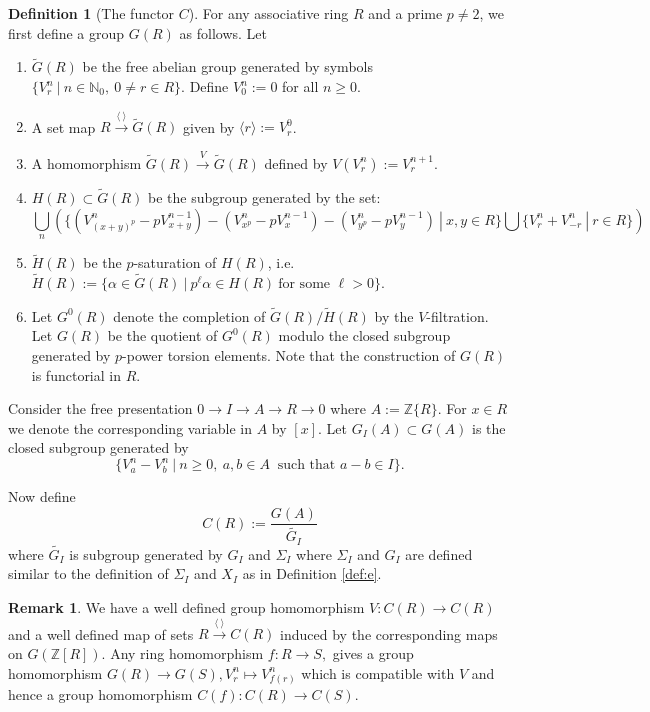 \documentclass[11pt]{amsart}
\theoremstyle{plain}
\theoremstyle{definition}
\newtheorem{remark}[thm]{Remark}
\newtheorem{definition}[thm]{Definition}
\newcommand{\Union}{\bigcup}
\renewcommand{\tilde}{\widetilde}
\newcommand{\N}{{\mathbb N}}
\newcommand{\Z}{{\mathbb Z}}
\newcommand{\ab}[1]{\langle {#1} \rangle}
\begin{document}
\begin{definition}[The functor $C$]\label{def:C}
For any associative ring $R$ and a prime $p\neq 2$, we first define a group $G(R)$ as follows. Let 
\begin{enumerate}
\item $\tilde{G}(R)$ be the free abelian group generated by symbols $\{ V^n_r \ | \ n\in \N_0 , \ 0\neq r\in R\}$. Define $V^n_0:=0$ for all $n\geq0$. 
\item A set map $R \xrightarrow{\ab{\ } } \tilde{G}(R)$ given by $\ab{r} := V^0_r$.
\item A homomorphism $\tilde{G}(R) \xrightarrow{V} \tilde{G}(R)$ defined by $V(V^n_r):= V^{n+1}_r$.
\item $H(R)\subset \tilde{G}(R)$ be the subgroup generated by the set: 
$$  \Union_n\left(\{(V^n_{(x+y)^p} - p V^{n-1}_{x+y}) - (V^n_{x^p} - p V^{n-1}_{x}) - (V^n_{y^p} - p V^{n-1}_{y})\ | \ x, y \in R \} \Union \{V^n_r+V^n_{-r} \ | \ r \in R\}\right)$$ 
\item $\tilde{H}(R)$ be the $p$-saturation of $H(R)$, i.e.
$ \tilde{H}(R):= \{ \alpha \in \tilde{G}(R) \ | \ p^\ell \alpha \in H(R) \ \text{for some } \ell >0\}$.
\item Let $G^0(R)$ denote the completion of $\tilde{G}(R)/\tilde{H}(R)$ by the $V$-filtration. Let $G(R)$ be the quotient of $G^0(R)$ modulo the closed subgroup generated by $p$-power torsion elements. Note that the construction of $G(R)$ is functorial in $R$.\\
\end{enumerate}
Consider the free presentation $0 \to I \to A \to R \to 0 $ where $A:=\Z\{R\}$. For $x \in R$ we denote the corresponding variable in $A$ by $[x]$. Let $G_I(A) \subset G(A)$ is the closed subgroup generated by $$\{V^n_a-V^n_b \ | \ n\geq 0,  \ a,b\in A \ \text{ such that } a-b\in I\}.$$

\noindent Now define $$C(R):= \frac{G(A)}{\tilde{G_I}}$$ where $\tilde{G_I}$ is subgroup generated by $G_I$ and $\Sigma_I$ where $\Sigma_I$ and $G_I$ are defined similar to the definition of $\Sigma_I$ and $X_I$ as in Definition \ref{def:e}. 
\end{definition} 

\begin{remark} We have a well defined group homomorphism $V: C(R)\to C(R)$ and a well defined map of sets $R \xrightarrow{\ab{ \ }} C(R)$ induced by the corresponding maps on $G(\Z[R])$. Any ring homomorphism $f: R \to S,$ gives a group homomorphism $G(R) \to G(S), V^n_r \mapsto V^n_{f(r)}$ which is compatible with $V$ and hence a group homomorphism $C(f): C(R) \to C(S)$. 
\end{remark}
\end{document}
